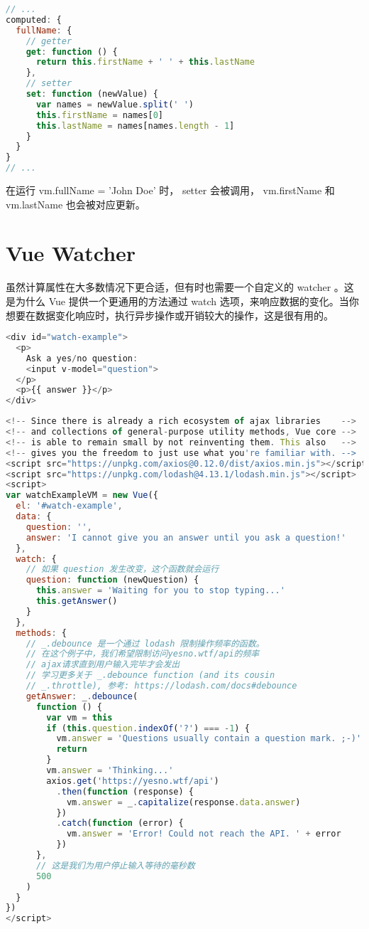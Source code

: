 \begin{lstlisting}[language=JavaScript]
// ...
computed: {
  fullName: {
    // getter
    get: function () {
      return this.firstName + ' ' + this.lastName
    },
    // setter
    set: function (newValue) {
      var names = newValue.split(' ')
      this.firstName = names[0]
      this.lastName = names[names.length - 1]
    }
  }
}
// ...
\end{lstlisting}


在运行 vm.fullName = 'John Doe' 时， setter 会被调用， vm.firstName 和 vm.lastName 也会被对应更新。

\chapter{Vue Watcher}


虽然计算属性在大多数情况下更合适，但有时也需要一个自定义的 watcher 。这是为什么 Vue 提供一个更通用的方法通过 watch 选项，来响应数据的变化。当你想要在数据变化响应时，执行异步操作或开销较大的操作，这是很有用的。



\begin{lstlisting}[language=JavaScript]
<div id="watch-example">
  <p>
    Ask a yes/no question:
    <input v-model="question">
  </p>
  <p>{{ answer }}</p>
</div>
\end{lstlisting}



\begin{lstlisting}[language=JavaScript]
<!-- Since there is already a rich ecosystem of ajax libraries    -->
<!-- and collections of general-purpose utility methods, Vue core -->
<!-- is able to remain small by not reinventing them. This also   -->
<!-- gives you the freedom to just use what you're familiar with. -->
<script src="https://unpkg.com/axios@0.12.0/dist/axios.min.js"></script>
<script src="https://unpkg.com/lodash@4.13.1/lodash.min.js"></script>
<script>
var watchExampleVM = new Vue({
  el: '#watch-example',
  data: {
    question: '',
    answer: 'I cannot give you an answer until you ask a question!'
  },
  watch: {
    // 如果 question 发生改变，这个函数就会运行
    question: function (newQuestion) {
      this.answer = 'Waiting for you to stop typing...'
      this.getAnswer()
    }
  },
  methods: {
    // _.debounce 是一个通过 lodash 限制操作频率的函数。
    // 在这个例子中，我们希望限制访问yesno.wtf/api的频率
    // ajax请求直到用户输入完毕才会发出
    // 学习更多关于 _.debounce function (and its cousin
    // _.throttle), 参考: https://lodash.com/docs#debounce
    getAnswer: _.debounce(
      function () {
        var vm = this
        if (this.question.indexOf('?') === -1) {
          vm.answer = 'Questions usually contain a question mark. ;-)'
          return
        }
        vm.answer = 'Thinking...'
        axios.get('https://yesno.wtf/api')
          .then(function (response) {
            vm.answer = _.capitalize(response.data.answer)
          })
          .catch(function (error) {
            vm.answer = 'Error! Could not reach the API. ' + error
          })
      },
      // 这是我们为用户停止输入等待的毫秒数
      500
    )
  }
})
</script>
\end{lstlisting}

